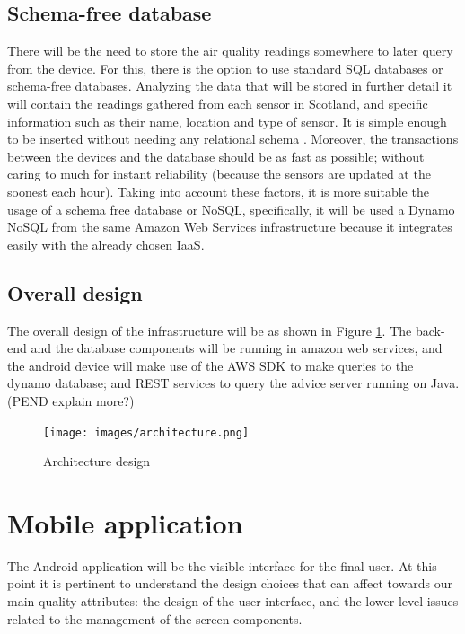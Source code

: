 \subsection{Schema-free database}
There will be the need to store the air quality readings somewhere to later query from the device. For this, there is the option to use standard SQL databases or schema-free databases. Analyzing the data that will be stored in further detail it will contain the readings gathered from each sensor in Scotland, and specific information such as their name, location and type of sensor. It is simple enough to be inserted without needing any relational schema . Moreover, the transactions between the devices and the database should be as fast as possible; without caring to much for instant reliability (because the sensors are updated at the soonest each hour). Taking into account these factors, it is more suitable the usage of a schema free database or NoSQL, specifically, it will be used a Dynamo NoSQL from the same Amazon Web Services infrastructure because it integrates easily with the already chosen IaaS. 

\subsection{Overall design}
The overall design of the infrastructure will be as shown in Figure \ref{fig:architecture}. The back-end and the database components will be running in amazon web services, and the android device will make use of the AWS SDK to make queries to the dynamo database; and REST services to query the advice server running on Java. (PEND explain more?)

\begin{figure}[H]
\begin{adjustbox}{width=.8\textwidth,center=\textwidth}
  \centering
  \texttt{[image: images/architecture.png]}
\end{adjustbox}
  \caption[Architecture design]{Architecture design}
  \label{fig:architecture}
\end{figure}

\section{Mobile application}
The Android application will be the visible interface for the final user. At this point it is pertinent to understand the design choices that can affect towards our main quality attributes: the design of the user interface, and the lower-level issues related to the management of the screen components. 

